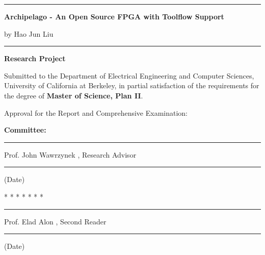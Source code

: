 \documentclass[12pt]{article}
\def\title{Archipelago - An Open Source FPGA with Toolflow Support}
\def\author{Hao Jun Liu}
\def\signatureA{Prof. John Wawrzynek}
\def\signatureB{Prof. Elad Alon}
\begin{document}
\thispagestyle{empty}

\begin{center}
\rule{5.5in}{0.40mm}

\vspace{0.35in}
\large{\bf\title{}}

\vspace{0.25in}
{\large by \author{}}

\vspace{0.35in}
\rule{5.5in}{0.40mm}

\vspace{0.5in}
{\large {\bf Research Project}}
\end{center}

Submitted to the Department of Electrical Engineering and
Computer Sciences, University of California at Berkeley,
in partial satisfaction of the requirements for the degree
of {\bf Master of Science, Plan II}.

\vspace{0.25in}
Approval for the Report and Comprehensive Examination:

\begin{center}
{\bf Committee:}

\vspace{0.25in}
\rule{3.5in}{0.25mm}

\signatureA
, Research Advisor

\vspace{0.25in}
\rule{3.5in}{0.25mm}

(Date)

\vspace{0.25in}
* * * * * * *

\vspace{0.25in}
\rule{3.5in}{0.25mm}

\signatureB
, Second Reader

\vspace{0.25in}
\rule{3.5in}{0.25mm}

(Date)
\end{center}
\end{document}
